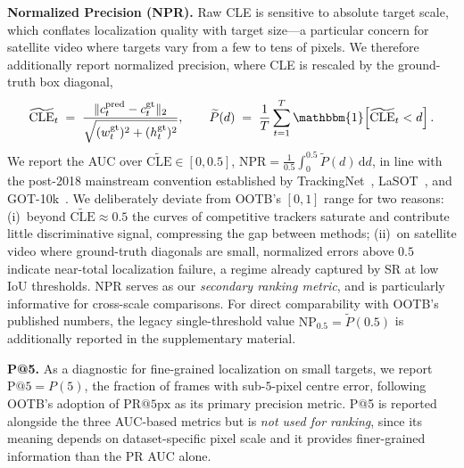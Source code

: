 \documentclass{article}
\begin{document}
\noindent\textbf{Normalized Precision (NPR).} Raw CLE is sensitive to absolute
target scale, which conflates localization quality with target size---a
particular concern for satellite video where targets vary from a few to tens of
pixels. We therefore additionally report normalized precision, where CLE is
rescaled by the ground-truth box diagonal,
\begin{equation}
\widetilde{\mathrm{CLE}}_t \;=\; \frac{\lVert c_t^{\mathrm{pred}} - c_t^{\mathrm{gt}} \rVert_2}{\sqrt{(w_t^{\mathrm{gt}})^2 + (h_t^{\mathrm{gt}})^2}},
\qquad
\widetilde{P}(d) \;=\; \frac{1}{T} \sum_{t=1}^{T} \mathbbm{1}\!\left[\widetilde{\mathrm{CLE}}_t < d\right].
\end{equation}
We report the AUC over $\widetilde{\mathrm{CLE}} \in [0, 0.5]$, $\mathrm{NPR} =
\frac{1}{0.5} \int_0^{0.5} \widetilde{P}(d)\, \mathrm{d}d$, in line with the
post-2018 mainstream convention established by
TrackingNet~\citep{muller2018trackingnet}, LaSOT~\citep{fan2019lasot}, and
GOT-10k~\citep{huang2021got10k}. We deliberately deviate from OOTB's $[0, 1]$
range for two reasons: (i)~beyond $\widetilde{\mathrm{CLE}} \approx 0.5$ the
curves of competitive trackers saturate and contribute little discriminative
signal, compressing the gap between methods; (ii)~on satellite video where
ground-truth diagonals are small, normalized errors above $0.5$ indicate
near-total localization failure, a regime already captured by SR at low IoU
thresholds. NPR serves as our \emph{secondary ranking metric}, and is
particularly informative for cross-scale comparisons. For direct comparability
with OOTB's published numbers, the legacy single-threshold value
$\mathrm{NP}_{0.5} = \widetilde{P}(0.5)$ is additionally reported in the
supplementary material.
 
\noindent\textbf{P@5.} As a diagnostic for fine-grained localization on small
targets, we report $\mathrm{P@5} = P(5)$, the fraction of frames with
sub-$5$-pixel centre error, following OOTB's adoption of $\mathrm{PR@5px}$ as
its primary precision metric. P@5 is reported alongside the three AUC-based
metrics but is \emph{not used for ranking}, since its meaning depends on
dataset-specific pixel scale and it provides finer-grained information than the
PR AUC alone.
 
\end{document}
